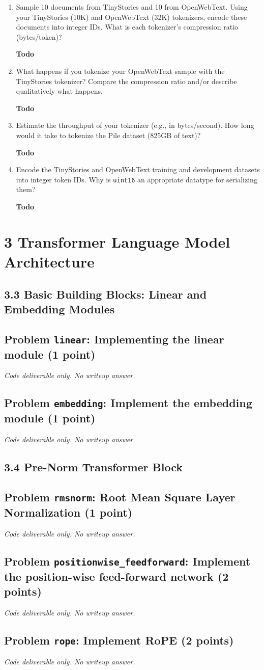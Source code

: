 \documentclass[11pt]{article}
\newcommand{\Todo}{\par\textbf{Todo}\par}
\newcommand{\CodeOnly}{\par\emph{Code deliverable only. No writeup answer.}\par}
\newcommand{\problem}[2]{%
  \subsection*{Problem \texttt{#1}: #2}%
}
\begin{document}
\begin{enumerate}[label=(\alph*)]
  \item Sample 10 documents from TinyStories and 10 from OpenWebText. Using your TinyStories (10K) and OpenWebText (32K) tokenizers, encode these documents into integer IDs. What is each tokenizer's compression ratio (bytes/token)?
  \Todo
  \item What happens if you tokenize your OpenWebText sample with the TinyStories tokenizer? Compare the compression ratio and/or describe qualitatively what happens.
  \Todo
  \item Estimate the throughput of your tokenizer (e.g., in bytes/second). How long would it take to tokenize the Pile dataset (825GB of text)?
  \Todo
  \item Encode the TinyStories and OpenWebText training and development datasets into integer token IDs. Why is \texttt{uint16} an appropriate datatype for serializing them?
  \Todo
\end{enumerate}

\section*{3 Transformer Language Model Architecture}

\subsection*{3.3 Basic Building Blocks: Linear and Embedding Modules}

\problem{linear}{Implementing the linear module (1 point)}

\CodeOnly

\problem{embedding}{Implement the embedding module (1 point)}

\CodeOnly

\subsection*{3.4 Pre-Norm Transformer Block}

\problem{rmsnorm}{Root Mean Square Layer Normalization (1 point)}

\CodeOnly

\problem{positionwise\_feedforward}{Implement the position-wise feed-forward network (2 points)}

\CodeOnly

\problem{rope}{Implement RoPE (2 points)}

\CodeOnly
\end{document}
